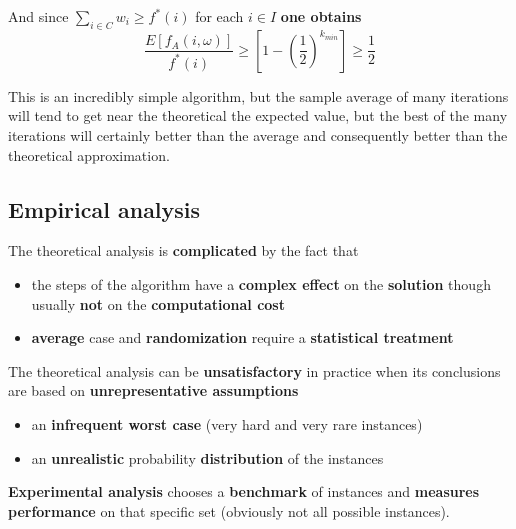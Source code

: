 \documentclass[11pt]{article}
\begin{document}
	And since $\sum_{i \in C} w_i \geq f^\ast (i)$ for each $i \in I$ \textbf{one obtains}
	$$ \frac{E \left[f_A (i, \omega)\right]}{f^\ast (i)} \geq \left[1 - \left(\frac{1}{2}\right)^{k_{min}}\right] \geq \frac{1}{2} $$
	
	This is an incredibly simple algorithm, but the sample average of many iterations will tend to get near the theoretical the expected value, but the best of the many iterations will certainly better than the average and consequently better than the theoretical approximation.\\
	
	
	\newpage
	
	\subsection{Empirical analysis}
	The theoretical analysis is \textbf{complicated} by the fact that
	\begin{itemize}
		\item the steps of the algorithm have a \textbf{complex effect} on the \textbf{solution} though usually \textbf{not} on the \textbf{computational cost}
		\item \textbf{average} case and \textbf{randomization} require a \textbf{statistical treatment}
	\end{itemize}
	The theoretical analysis can be \textbf{unsatisfactory} in practice when its conclusions are based on \textbf{unrepresentative assumptions}
	\begin{itemize}
		\item an \textbf{infrequent worst case} (very hard and very rare instances)
		\item an \textbf{unrealistic} probability \textbf{distribution} of the instances
	\end{itemize}
	
	\textbf{Experimental analysis} chooses a \textbf{benchmark} of instances and \textbf{measures performance} on that specific set (obviously not all possible instances).\\
	
\end{document}
